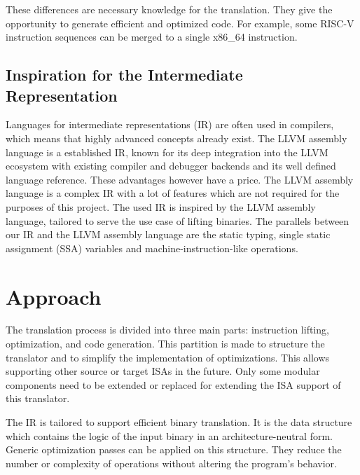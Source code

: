 \documentclass[course=eragp]{aspdoc}
\begin{document}
\par

These differences are necessary knowledge for the translation. They give the opportunity to generate efficient and
optimized code. For example, some RISC-V instruction sequences can be merged to a single x86\_64
instruction.

\subsection{Inspiration for the Intermediate Representation}

Languages for intermediate representations (IR) are often used in compilers, which means that highly
advanced concepts already exist. The LLVM assembly language is a established IR, known for its deep
integration into the LLVM ecosystem with existing compiler and debugger backends and its well
defined language reference. These advantages however have a price. The LLVM assembly language is a
complex IR with a lot of features which are not required for the purposes of this project. The used IR
is inspired by the LLVM assembly language, tailored to serve the use case of lifting binaries. The
parallels between our IR and the LLVM assembly language are the static
typing, single static assignment (SSA) variables and machine-instruction-like operations.

\section{Approach}\label{sec:approach}

The translation process is divided into three main parts: instruction lifting, optimization, and code
generation. This partition is made to structure the translator and to simplify the implementation of
optimizations. This allows supporting other source or target ISAs in the future.
Only some modular components need to be extended or replaced for extending the ISA support of this translator.

\par

The IR is tailored to support efficient binary translation. It is the data structure which
contains the logic of the input binary in an architecture-neutral form. Generic optimization
passes can be applied on this structure. They reduce the number or complexity of operations without altering the
program's behavior.

\par
\end{document}
